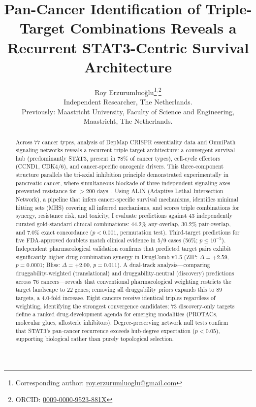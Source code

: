 \documentclass[times, twoside, watermark]{zHenriquesLab-StyleBioRxiv}
\providecommand{\shorttitle}[1]{}
\providecommand{\shorttitle}[1]{}
\begin{document}
\title{Pan-Cancer Identification of Triple-Target Combinations Reveals a Recurrent STAT3-Centric Survival Architecture}
\shorttitle{Pan-Cancer Triple-Target Combinations}

\author{Roy Erzurumluoğlu\thanks{Corresponding author: \href{mailto:roy.erzurumluoglu@gmail.com}{roy.erzurumluoglu@gmail.com}}$^{,}$\thanks{ORCID: \href{https://orcid.org/0009-0000-9523-881X}{0009-0000-9523-881X}}\\
  Independent Researcher, The Netherlands.\\
  {\small Previously: Maastricht University, Faculty of Science and Engineering, Maastricht, The Netherlands.}}

\maketitle

\begin{abstract}
Across 77 cancer types, analysis of DepMap CRISPR essentiality data and OmniPath signaling networks reveals a recurrent triple-target architecture: a convergent survival hub (predominantly STAT3, present in 78\% of cancer types), cell-cycle effectors (CCND1, CDK4/6), and cancer-specific oncogenic drivers. This three-component structure parallels the tri-axial inhibition principle demonstrated experimentally in pancreatic cancer, where simultaneous blockade of three independent signaling axes prevented resistance for $>$200 days~\cite{Liaki2025}. Using ALIN (Adaptive Lethal Intersection Network), a pipeline that infers cancer-specific survival mechanisms, identifies minimal hitting sets (MHS) covering all inferred mechanisms, and scores triple combinations for synergy, resistance risk, and toxicity, I evaluate predictions against 43 independently curated gold-standard clinical combinations: 44.2\% any-overlap, 30.2\% pair-overlap, and 7.0\% exact concordance ($p < 0.001$, permutation test). Third-target predictions for five FDA-approved doublets match clinical evidence in 5/9 cases (56\%; $p \leq 10^{-5}$). Independent pharmacological validation confirms that predicted target pairs exhibit significantly higher drug combination synergy in DrugComb v1.5 (ZIP: $\Delta = +2.59$, $p = 0.0001$; Bliss: $\Delta = +2.00$, $p = 0.011$). A dual-track analysis---comparing druggability-weighted (translational) and druggability-neutral (discovery) predictions across 76 cancers---reveals that conventional pharmacological weighting restricts the target landscape to 22 genes; removing all druggability priors expands this to 89 targets, a 4.0-fold increase. Eight cancers receive identical triples regardless of weighting, identifying the strongest convergence candidates; 73 discovery-only targets define a ranked drug-development agenda for emerging modalities (PROTACs, molecular glues, allosteric inhibitors). Degree-preserving network null tests confirm that STAT3's pan-cancer recurrence exceeds hub-degree expectation ($p < 0.05$), supporting biological rather than purely topological selection.
\end{abstract}
\end{document}
